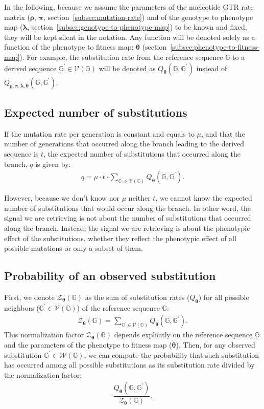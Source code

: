 \documentclass{article}
\newcommand{\Multiply}{\cdot}
\newcommand{\Geno}{\mathbb{G}}
\newcommand{\GenoDer}{\Geno^{\prime}}
\newcommand{\setNeighbors}{\mathcal{V}\left(\Geno\right)}
\newcommand{\Observed}{\mathcal{W}\left(\Geno\right)}
\newcommand{\PhenoParam}{\bm{\lambda}}
\newcommand{\FitParam}{\bm{\theta}}
\newcommand{\exchan}{\rho}
\newcommand{\Exchan}{\bm{\exchan}}
\newcommand{\mutequi}{\pi}
\newcommand{\Mutequi}{\bm{\mutequi}}
\newcommand{\PsubDef}{Q}
\newcommand{\PsubAll}{\PsubDef_{\Exchan, \Mutequi, \PhenoParam, \FitParam}}
\newcommand{\Psub}{\PsubDef_{\FitParam}}
\newcommand{\Normalize}{\mathcal{Z}_{\FitParam}\left(\Geno\right)}
\begin{document}
    In the following, because we assume the parameters of the nucleotide GTR rate matrix ($\Exchan$, $\Mutequi$, section~\ref{subsec:mutation-rate}) and of the genotype to phenotype map ($\PhenoParam$, section~\ref{subsec:genotype-to-phenotype-map}) to be known and fixed, they will be kept silent in the notation.
    Any function will be denoted solely as a function of the phenotype to fitness map: $\FitParam$ (section~\ref{subsec:phenotype-to-fitness-map}).
    For example, the substitution rate from the reference sequence $\Geno$ to a derived sequence $\GenoDer \in \setNeighbors$ will be denoted as $\Psub \left( \Geno,\GenoDer \right)$ instead of $\PsubAll \left( \Geno,\GenoDer \right)$.

    \subsection{Expected number of substitutions}\label{subsec:expected-number-of-substitutions}
    If the mutation rate per generation is constant and equals to $\mu$, and that the number of generations that occurred along the branch leading to the derived sequence is $t$, the expected number of substitutions that occurred along the branch, $q$ is given by:
    \begin{align}
        q = \mu \Multiply t \Multiply \sum_{\GenoDer \in \setNeighbors} \Psub \left( \Geno,\GenoDer \right).
    \end{align}

    However, because we don't know nor $\mu$ neither $t$, we cannot know the expected number of substitutions that would occur along the branch.
    In other word, the signal we are retrieving is not about the number of substitutions that occurred along the branch.
    Instead, the signal we are retrieving is about the phenotypic effect of the substitutions, whether they reflect the phenotypic effect of all possible mutations or only a subset of them.

    \subsection{Probability of an observed substitution}\label{subsec:probability-of-an-observed-substitution}
    First, we denote $\Normalize$ as the sum of substitution rates ($ \Psub $) for all possible neighbors ($\GenoDer \in \setNeighbors$) of the reference sequence $\Geno$:
    \begin{align}
        \Normalize = \sum_{\GenoDer \in \setNeighbors} \Psub \left( \Geno,\GenoDer \right).
    \end{align}
    This normalization factor $\Normalize$ depends explicitly on the reference sequence $\Geno$ and the parameters of the phenotype to fitness map ($\FitParam$).
    Then, for any observed substitution $\GenoDer \in \Observed$, we can compute the probability that such substitution has occurred among all possible substitutions as its substitution rate divided by the normalization factor:
    \begin{align}
        \dfrac{\Psub \left( \Geno,\GenoDer \right)}{\Normalize}.
    \end{align}
\end{document}
